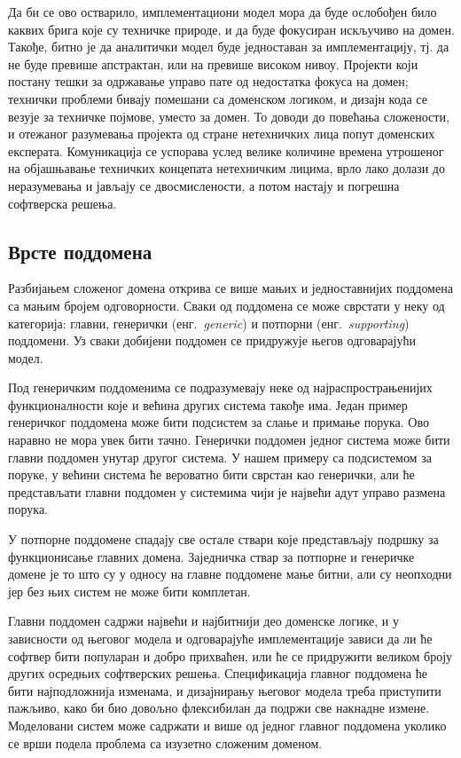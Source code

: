 \documentclass[12pt,oneside]{memoir}
\begin{document}
Да би се ово остварило, имплементациони модел мора да буде ослобођен било каквих брига које су техничке природе, и да буде фокусиран искључиво на домен. Такође, битно је да аналитички модел буде једноставан за имплементацију, тј. да не буде превише апстрактан, или на превише високом нивоу. Пројекти који постану тешки за одржавање управо пате од недостатка фокуса на домен; технички проблеми бивају помешани са доменском логиком, и дизајн кода се везује за техничке појмове, уместо за домен. То доводи до повећања сложености, и отежаног разумевања пројекта од стране нетехничких лица попут доменских експерата. Комуникација се успорава услед велике количине времена утрошеног на објашњавање техничких концепата нетехничким лицима, врло лако долази до неразумевања и јављају се двосмислености, а потом настају и погрешна софтверска решења.

\subsection{Врсте поддомена}
Разбијањем сложеног домена открива се више мањих и једноставнијих поддомена са мањим бројем одговорности. Сваки од поддомена се може сврстати у неку од категорија: главни, генерички (енг.~\textit{generic}) и потпорни (енг.~\textit{supporting}) поддомени. Уз сваки добијени поддомен се придружује његов одговарајући модел.

Под генеричким поддоменима се подразумевају неке од најраспрострањенијих функционалности које и већина других система такође има. Један пример генеричког поддомена може бити подсистем за слање и примање порука. Ово наравно не мора увек бити тачно. Генерички поддомен једног система може бити главни поддомен унутар другог система. У нашем примеру са подсистемом за поруке, у већини система ће вероватно бити сврстан као генерички, али ће представљати главни поддомен у системима чији је највећи адут управо размена порука.

У потпорне поддомене спадају све остале ствари које представљају подршку за функционисање главних домена. Заједничка ствар за потпорне и генеричке домене је то што су у односу на главне поддомене мање битни, али су неопходни јер без њих систем не може бити комплетан.

Главни поддомен садржи највећи и најбитнији део доменске логике, и у зависности од његовог модела и одговарајуће имплементације зависи да ли ће софтвер бити популаран и добро прихваћен, или ће се придружити великом броју других осредњих софтверских решења. Спецификација главног поддомена ће бити најподложнија изменама, и дизајнирању његовог модела треба приступити пажљиво, како би био довољно флексибилан да подржи све накнадне измене. Моделовани систем може садржати и више од једног главног поддомена уколико се врши подела проблема са изузетно сложеним доменом.
\end{document}
